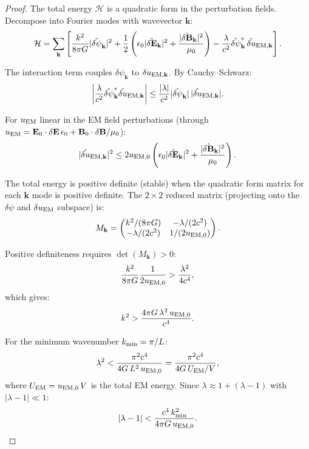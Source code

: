 \documentclass[aps,prd,twocolumn,superscriptaddress,floatfix,nofootinbib]{revtex4-2}
\newcommand{\lam}{\lambda}
\begin{document}
\begin{proof}
The total energy $\mathcal{H}$ is a quadratic form in the perturbation
fields. Decompose into Fourier modes with wavevector $\mathbf{k}$:
\begin{equation}
\mathcal{H} = \sum_{\mathbf{k}}\left[
  \frac{k^2}{8\pi G}|\hat{\delta\psi}_\mathbf{k}|^2
  + \frac{1}{2}\left(\epsilon_0|\hat{\delta\mathbf{E}}_\mathbf{k}|^2
  + \frac{|\hat{\delta\mathbf{B}}_\mathbf{k}|^2}{\mu_0}\right)
  - \frac{\lam}{c^2}\hat{\delta\psi}_\mathbf{k}^*\,
  \hat{\delta u}_{{\rm EM},\mathbf{k}}
\right].
\end{equation}

The interaction term couples $\delta\psi_\mathbf{k}$ to
$\delta u_{{\rm EM},\mathbf{k}}$. By Cauchy--Schwarz:
\begin{equation}
\left|\frac{\lam}{c^2}\hat{\delta\psi}_\mathbf{k}^*
\hat{\delta u}_{{\rm EM},\mathbf{k}}\right|
\leq \frac{|\lam|}{c^2}
|\hat{\delta\psi}_\mathbf{k}|\,
|\hat{\delta u}_{{\rm EM},\mathbf{k}}|.
\end{equation}

For $u_{\rm EM}$ linear in the EM field perturbations (through
$u_{\rm EM} = \mathbf{E}_0\cdot\delta\mathbf{E}\,\epsilon_0
+ \mathbf{B}_0\cdot\delta\mathbf{B}/\mu_0$):
\begin{equation}
|\hat{\delta u}_{{\rm EM},\mathbf{k}}|^2
\leq 2u_{\rm EM,0}\left(\epsilon_0|\hat{\delta\mathbf{E}}_\mathbf{k}|^2
+ \frac{|\hat{\delta\mathbf{B}}_\mathbf{k}|^2}{\mu_0}\right).
\end{equation}

The total energy is positive definite (stable) when the quadratic
form matrix for each $\mathbf{k}$ mode is positive definite. The
$2\times 2$ reduced matrix (projecting onto the $\delta\psi$ and
$\delta u_{\rm EM}$ subspace) is:
\begin{equation}
M_\mathbf{k} = \begin{pmatrix}
k^2/(8\pi G) & -\lam/(2c^2) \\
-\lam/(2c^2) & 1/(2u_{\rm EM,0})
\end{pmatrix}.
\end{equation}

Positive definiteness requires $\det(M_\mathbf{k}) > 0$:
\begin{equation}
\frac{k^2}{8\pi G}\frac{1}{2u_{\rm EM,0}}
> \frac{\lam^2}{4c^4},
\end{equation}
which gives:
\begin{equation}
k^2 > \frac{4\pi G\,\lam^2\,u_{\rm EM,0}}{c^4}.
\end{equation}

For the minimum wavenumber $k_{\rm min} = \pi/L$:
\begin{equation}
\lam^2 < \frac{\pi^2 c^4}{4G\,L^2\,u_{\rm EM,0}}
= \frac{\pi^2 c^4}{4G\,U_{\rm EM}/V},
\end{equation}
where $U_{\rm EM} = u_{\rm EM,0}\,V$ is the total EM energy.
Since $\lam \approx 1 + (\lam - 1)$ with $|\lam - 1| \ll 1$:
\begin{equation}
|\lam - 1| < \frac{c^4\,k_{\rm min}^2}{4\pi G\,u_{\rm EM,0}}.
\end{equation}
\end{proof}
\end{document}
